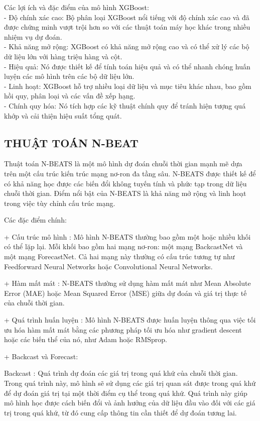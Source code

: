 \documentclass{article}
\begin{document}
\begin{multicols}{2}
       Các lợi ích và đặc điểm của mô hình XGBoost:\\
       - Độ chính xác cao: Bộ phân loại XGBoost nổi tiếng với độ chính xác cao và đã được chứng minh vượt trội hơn so với các thuật toán máy học khác trong nhiều nhiệm vụ dự đoán.\\
       - Khả năng mở rộng: XGBoost có khả năng mở rộng cao và có thể xử lý các bộ dữ liệu lớn với hàng triệu hàng và cột.\\
       - Hiệu quả: Nó được thiết kế để tính toán hiệu quả và có thể nhanh chóng huấn luyện các mô hình trên các bộ dữ liệu lớn.\\
       - Linh hoạt: XGBoost hỗ trợ nhiều loại dữ liệu và mục tiêu khác nhau, bao gồm hồi quy, phân loại và các vấn đề xếp hạng.\\
       - Chính quy hóa: Nó tích hợp các kỹ thuật chính quy để tránh hiện tượng quá khớp và cải thiện hiệu suất tổng quát.


    \subsection{THUẬT TOÁN N-BEAT}

    Thuật toán N-BEATS là một mô hình dự đoán chuỗi thời gian mạnh mẽ dựa trên một cấu trúc kiến trúc mạng nơ-ron đa tầng sâu. N-BEATS được thiết kế để có khả năng học được các biến đổi không tuyến tính và phức tạp trong dữ liệu chuỗi thời gian. Điểm nổi bật của N-BEATS là khả năng mở rộng và linh hoạt trong việc tùy chỉnh cấu trúc mạng. 

    Các đặc điểm chính: 
    
        + Cấu trúc mô hình : Mô hình N-BEATS thường bao gồm một hoặc nhiều khối có thể lặp lại. Mỗi khối bao gồm hai mạng nơ-ron: một mạng BackcastNet và một mạng ForecastNet. Cả hai mạng này thường có cấu trúc tương tự như Feedforward Neural Networks hoặc Convolutional Neural Networks.
    
        + Hàm mất mát : N-BEATS thường sử dụng hàm mất mát như Mean Absolute Error (MAE) hoặc Mean Squared Error (MSE) giữa dự đoán và giá trị thực tế của chuỗi thời gian. 
    
        + Quá trình huấn luyện : Mô hình N-BEATS được huấn luyện thông qua việc tối ưu hóa hàm mất mát bằng các phương pháp tối ưu hóa như gradient descent hoặc các biến thể của nó, như Adam hoặc RMSprop.
    
        + Backcast và Forecast:
        
            Backcast : Quá trình dự đoán các giá trị trong quá khứ của chuỗi thời gian. Trong quá trình này, mô hình sẽ sử dụng các giá trị quan sát được trong quá khứ để dự đoán giá trị tại một thời điểm cụ thể trong quá khứ. Quá trình này giúp mô hình học được cách biến đổi và ảnh hưởng của dữ liệu đầu vào đối với các giá trị trong quá khứ, từ đó cung cấp thông tin cần thiết để dự đoán tương lai.
    

\end{multicols}
\end{document}
